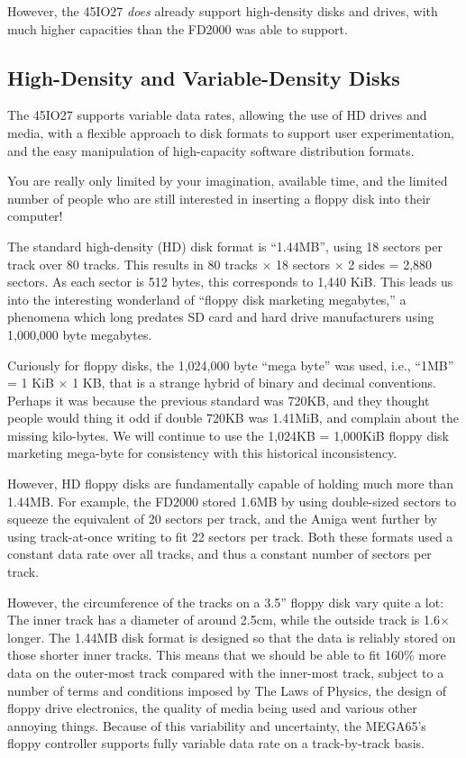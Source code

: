 However, the 45IO27 {\em does} already support high-density disks and drives, with much
higher capacities than the FD2000 was able to support.

\subsection{High-Density and Variable-Density Disks}

The 45IO27 supports variable data rates, allowing the use of HD drives and media,
with a flexible approach to disk formats to support user experimentation, and the
easy manipulation of high-capacity software distribution formats.

You are really only limited by your imagination, available time, and
the limited number of people who are still interested in inserting a
floppy disk into their computer!

The standard high-density (HD) disk format is ``1.44MB'', using 18 sectors per track over 80 tracks.
This results in 80 tracks $\times$ 18 sectors $\times$ 2 sides = 2,880 sectors. As each sector
is 512 bytes, this corresponds to 1,440 KiB.  This leads us into the interesting wonderland of
``floppy disk marketing megabytes,'' a phenomena which long predates SD card and hard drive
manufacturers using 1,000,000 byte megabytes.

Curiously for floppy disks, the 1,024,000 byte ``mega byte'' was used, i.e., ``1MB'' = 1 KiB $\times$ 1 KB,
that is a strange hybrid of binary and decimal conventions.  Perhaps it was because the previous standard
was 720KB, and they thought people would thing it odd if double 720KB was 1.41MiB, and complain about the
missing kilo-bytes.  We will continue to use the 1,024KB = 1,000KiB floppy disk marketing mega-byte for
consistency with this historical inconsistency.

However, HD floppy disks are fundamentally capable of holding much more than 1.44MB. For example, the FD2000
stored 1.6MB by using double-sized sectors to squeeze the equivalent of 20 sectors per track, and the Amiga
went further by using track-at-once writing to fit 22 sectors per track. Both these formats used a constant
data rate over all tracks, and thus a constant number of sectors per track.

However, the circumference of the tracks on a 3.5'' floppy disk vary quite a lot: The inner track has a diameter
of around 2.5cm, while the outside track is 1.6$\times$ longer. 
The 1.44MB disk format is designed so that
the data is reliably stored on those shorter inner tracks.
This means that we should be able to fit 160\%
more data on the outer-most track compared with the inner-most track, subject to a number of terms and conditions
imposed by The Laws of Physics, the design of floppy drive electronics, the quality of media being used and
various other annoying things.
Because of this variability and uncertainty, the MEGA65's floppy controller supports fully variable data rate
on a track-by-track basis.

